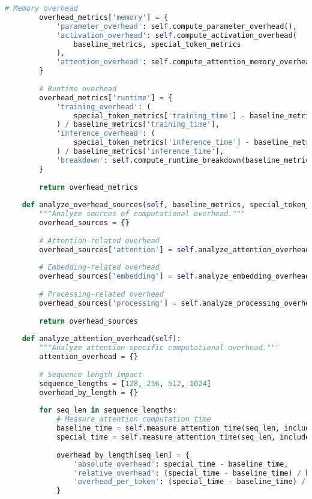 \begin{lstlisting}[language=Python, caption=Comprehensive computational efficiency optimization framework]
        # Memory overhead
        overhead_metrics['memory'] = {
            'parameter_overhead': self.compute_parameter_overhead(),
            'activation_overhead': self.compute_activation_overhead(
                baseline_metrics, special_token_metrics
            ),
            'attention_overhead': self.compute_attention_memory_overhead()
        }
        
        # Runtime overhead
        overhead_metrics['runtime'] = {
            'training_overhead': (
                special_token_metrics['training_time'] - baseline_metrics['training_time']
            ) / baseline_metrics['training_time'],
            'inference_overhead': (
                special_token_metrics['inference_time'] - baseline_metrics['inference_time']
            ) / baseline_metrics['inference_time'],
            'breakdown': self.compute_runtime_breakdown(baseline_metrics, special_token_metrics)
        }
        
        return overhead_metrics
    
    def analyze_overhead_sources(self, baseline_metrics, special_token_metrics):
        """Analyze sources of computational overhead."""
        overhead_sources = {}
        
        # Attention-related overhead
        overhead_sources['attention'] = self.analyze_attention_overhead()
        
        # Embedding-related overhead
        overhead_sources['embedding'] = self.analyze_embedding_overhead()
        
        # Processing-related overhead
        overhead_sources['processing'] = self.analyze_processing_overhead()
        
        return overhead_sources
    
    def analyze_attention_overhead(self):
        """Analyze attention-specific computational overhead."""
        attention_overhead = {}
        
        # Sequence length impact
        sequence_lengths = [128, 256, 512, 1024]
        overhead_by_length = {}
        
        for seq_len in sequence_lengths:
            # Measure attention computation time
            baseline_time = self.measure_attention_time(seq_len, include_special_tokens=False)
            special_time = self.measure_attention_time(seq_len, include_special_tokens=True)
            
            overhead_by_length[seq_len] = {
                'absolute_overhead': special_time - baseline_time,
                'relative_overhead': (special_time - baseline_time) / baseline_time,
                'overhead_per_token': (special_time - baseline_time) / len(self.special_tokens)
            }
        

\end{lstlisting}
